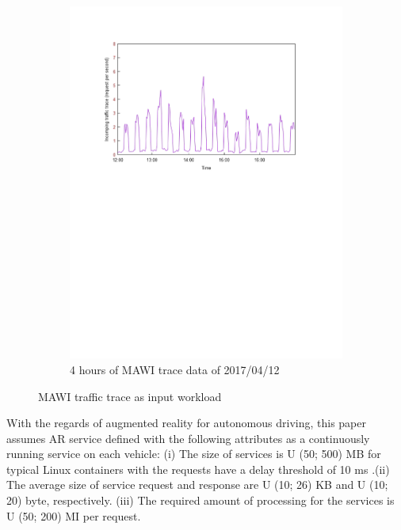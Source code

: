 \documentclass[twocolumn]{article}
\begin{document}
\begin{figure}
\begin{subfigure}{\columnwidth}
			\includegraphics[clip, trim=2.5cm 15cm 3.6cm 2.5cm, width=\columnwidth]{figures/pdf/traffic-2.pdf}
			\caption{4 hours of MAWI trace data of 2017/04/12}
		\end{subfigure}	
		\caption{MAWI traffic trace as input workload}
		\label{fig:traffic}
\end{figure}

\par With the regards of augmented reality for autonomous driving\cite{wintersberger2019fostering,feng2018augmented}, this paper assumes AR service defined with the following attributes as a continuously running service on each vehicle: (i) The size of services is U (50; 500) MB for typical Linux containers\cite{montero2017extending} with the requests have a delay threshold of 10 ms \cite{byers2017architectural}.(ii) The average size of service request and response are U (10; 26) KB and U (10; 20) byte, respectively\cite{ha2013impact}. (iii) The required amount of processing for the services is U (50; 200) MI per request\cite{skarlat2017optimized,yousefpour2019fogplan}.
\end{document}
